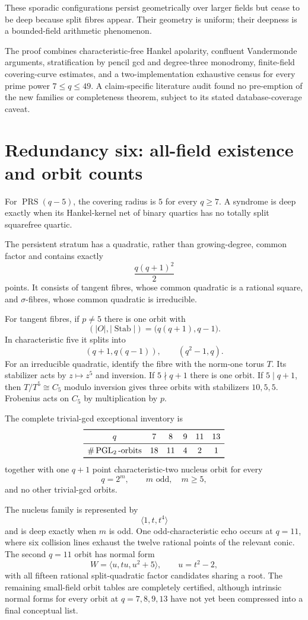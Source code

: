 \documentclass[11pt]{article}
\newcommand{\PGL}{\operatorname{PGL}}
\newcommand{\PRS}{\operatorname{PRS}}
\newcommand{\Stab}{\operatorname{Stab}}
\begin{document}
These sporadic configurations persist geometrically over larger fields
but cease to be deep because split fibres appear.  Their geometry is
uniform; their deepness is a bounded-field arithmetic phenomenon.

The proof combines characteristic-free Hankel apolarity, confluent
Vandermonde arguments, stratification by pencil gcd and degree-three
monodromy, finite-field covering-curve estimates, and a two-implementation
exhaustive census for every prime power $7\leq q\leq49$.  A
claim-specific literature audit found no pre-emption of the new families
or completeness theorem, subject to its stated database-coverage caveat.

\section{Redundancy six: all-field existence and orbit counts}

For $\PRS(q-5)$, the covering radius is $5$ for every $q\geq7$.  A
syndrome is deep exactly when its Hankel-kernel net of binary quartics has
no totally split squarefree quartic.

The persistent stratum has a quadratic, rather than growing-degree,
common factor and contains exactly
\[
 \frac{q(q+1)^2}{2}
\]
points.  It consists of tangent fibres, whose common quadratic is a
rational square, and $\sigma$-fibres, whose common quadratic is
irreducible.

For tangent fibres, if $p\ne5$ there is one orbit with
\[
 (|O|,|\Stab|)=\bigl(q(q+1),q-1\bigr).
\]
In characteristic five it splits into
\[
 (q+1,q(q-1)),\qquad(q^2-1,q).
\]
For an irreducible quadratic, identify the fibre with the norm-one torus
$T$.  Its stabilizer acts by $z\mapsto z^5$ and inversion.  If
$5\nmid q+1$ there is one orbit.  If $5\mid q+1$, then
$T/T^5\cong C_5$ modulo inversion gives three orbits with stabilizers
$10,5,5$.  Frobenius acts on $C_5$ by multiplication by $p$.

The complete trivial-gcd exceptional inventory is
\[
\begin{array}{c@{\quad}ccccc}
\toprule
q&7&8&9&11&13\\
\midrule
\#\PGL_2\text{-orbits}&18&11&4&2&1\\
\bottomrule
\end{array}
\]
together with one $q+1$ point characteristic-two nucleus orbit for every
\[
 q=2^m,\qquad m\text{ odd},\quad m\geq5,
\]
and no other trivial-gcd orbits.

The nucleus family is represented by
\[
 \langle1,t,t^4\rangle
\]
and is deep exactly when $m$ is odd.  One odd-characteristic echo occurs
at $q=11$, where six collision lines exhaust the twelve rational points
of the relevant conic.  The second $q=11$ orbit has normal form
\[
 W=\langle u,tu,u^2+5\rangle,\qquad u=t^2-2,
\]
with all fifteen rational split-quadratic factor candidates sharing a
root.  The remaining small-field orbit tables are completely certified,
although intrinsic normal forms for every orbit at $q=7,8,9,13$ have not
yet been compressed into a final conceptual list.
\end{document}
